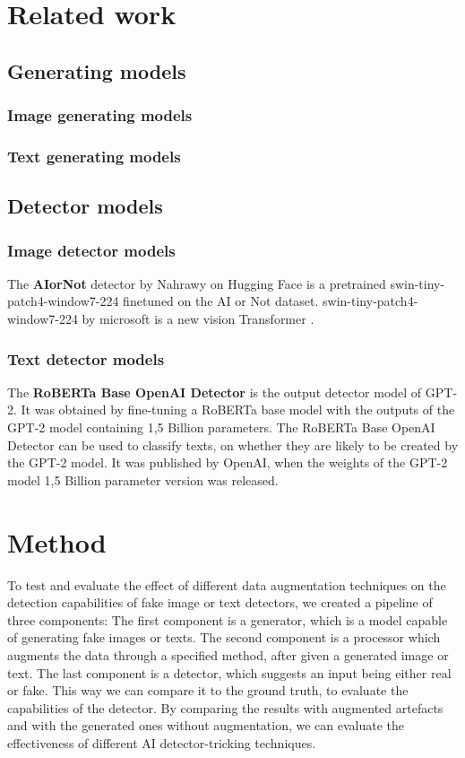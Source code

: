 \documentclass{article} %
\begin{document}
\section{Related work}

\subsection{Generating models}

\subsubsection{Image generating models}

\subsubsection{Text generating models}

\subsection{Detector models}

\subsubsection{Image detector models}

The \textbf{AIorNot} detector by Nahrawy on Hugging Face is a pretrained swin-tiny-patch4-window7-224 finetuned on the AI or Not dataset. swin-tiny-patch4-window7-224 by microsoft is a new vision Transformer \cite{liu2021swin}.

\subsubsection{Text detector models}

The \textbf{RoBERTa Base OpenAI Detector} is the output detector model of GPT-2. It was obtained by fine-tuning a RoBERTa base model with the outputs of the GPT-2 model containing 1,5 Billion parameters. The RoBERTa Base OpenAI Detector can be used to classify texts, on whether they are likely to be created by the GPT-2 model. It was published by OpenAI, when the weights of the GPT-2 model 1,5 Billion parameter version was released.


\section{Method}
To test and evaluate the effect of different data augmentation techniques on the detection capabilities of fake image or text detectors, we created a pipeline of three components: The first component is a generator, which is a model capable of generating fake images or texts. The second component is a processor which augments the data through a specified method, after given a generated image or text. The last component is a detector, which suggests an input being either real or fake. This way we can compare it to the ground truth, to evaluate the capabilities of the detector. By comparing the results with augmented artefacts and with the generated ones without augmentation, we can evaluate the effectiveness of different AI detector-tricking techniques.
\end{document}
